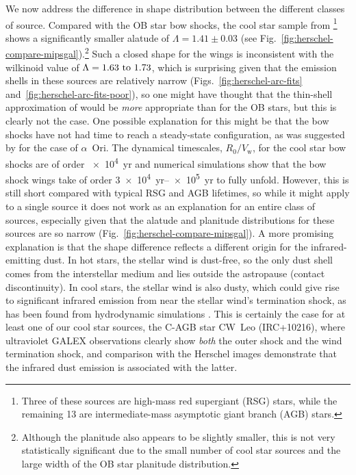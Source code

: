 \documentclass[useAMS, usenatbib, a4paper]{mnras}
\newcommand{\wind}{\ensuremath{_{\text{w}}}}
\begin{document}
We now address the difference in shape distribution between the
different classes of source.  Compared with the OB star bow shocks,
the cool star sample from \citet{Cox:2012a}\footnote{Three of these
  sources are high-mass red supergiant (RSG) stars, while the
  remaining 13 are intermediate-mass asymptotic giant branch (AGB)
  stars.} shows a significantly smaller alatude of
\(\Lambda = 1.41 \pm 0.03\) (see
Fig.~\ref{fig:herschel-compare-mipsgal}).\footnote{Although the
  planitude also appears to be slightly smaller, this is not very
  statistically significant due to the small number of cool star
  sources and the large width of the OB star planitude distribution.}
Such a closed shape for the wings is inconsistent with the wilkinoid
value of \(\Lambda = \text{\numrange{1.63}{1.73}}\), which is surprising
given that the emission shells in these sources are relatively narrow
(Figs.~\ref{fig:herschel-arc-fits}
and~\ref{fig:herschel-arc-fits-poor}), so one might have thought that
the thin-shell approximation of \citet{Wilkin:1996a} would be
\emph{more} appropriate than for the OB stars, but this is clearly not
the case.  One possible explanation for this might be that the bow
shocks have not had time to reach a steady-state configuration, as was
suggested by \citet{Mohamed:2012a} for the case of \(\alpha\)~Ori.  The
dynamical timescales, \(R_0 / V\wind\), for the cool star bow shocks
are of order \SI{e4}{yr} and numerical simulations \citetext{e.g.,
  Fig.~11 of \citealp{Mohamed:2012a} and Fig.~2 of
  \citealp{van-Marle:2014a}} show that the bow shock wings take of
order \SIrange{3e4}{e5}{yr} to fully unfold.  However, this is still
short compared with typical RSG and AGB lifetimes, so while it might
apply to a single source it does not work as an explanation for an
entire class of sources, especially given that the alatude and
planitude distributions for these sources are so narrow
(Fig.~\ref{fig:herschel-compare-mipsgal}).  A more promising
explanation is that the shape difference reflects a different origin
for the infrared-emitting dust.  In hot stars, the stellar wind is
dust-free, so the only dust shell comes from the interstellar medium
and lies outside the astropause (contact discontinuity).  In cool
stars, the stellar wind is also dusty, which could give rise to
significant infrared emission from near the stellar wind's termination
shock, as has been found from hydrodynamic simulations
\citep{Meyer:2014b}.  This is certainly the case for at least one of
our cool star sources, the C-AGB star CW~Leo (IRC+10216), where
ultraviolet GALEX observations \citep{Sahai:2010a} clearly show
\emph{both} the outer shock and the wind termination shock, and
comparison with the Herschel images demonstrate that the infrared dust
emission is associated with the latter.
\end{document}
